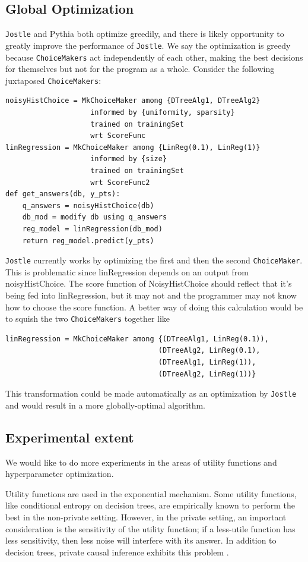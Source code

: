 \documentclass[11pt]{report}
\newcommand{\Jostle}{\texttt{Jostle}}
\renewcommand{\t}[1]{\texttt{#1}}
\begin{document}
\subsection{Global Optimization}
\Jostle{} and Pythia both optimize greedily, and there is likely opportunity to greatly improve the performance of \Jostle{}. We say the optimization is greedy because \t{ChoiceMakers} act independently of each other, making the best decisions for themselves but not for the program as a whole. Consider the following juxtaposed \t{ChoiceMakers}:
\begin{lstlisting}[style=MyPythonStyle]
noisyHistChoice = MkChoiceMaker among {DTreeAlg1, DTreeAlg2}
                    informed by {uniformity, sparsity}
                    trained on trainingSet 
                    wrt ScoreFunc
linRegression = MkChoiceMaker among {LinReg(0.1), LinReg(1)}
                    informed by {size}
                    trained on trainingSet
                    wrt ScoreFunc2
def get_answers(db, y_pts):
    q_answers = noisyHistChoice(db)
    db_mod = modify db using q_answers
    reg_model = linRegression(db_mod)
    return reg_model.predict(y_pts)
\end{lstlisting}
\Jostle{} currently works by optimizing the first and then the second \t{ChoiceMaker}. This is problematic since linRegression depends on an output from noisyHistChoice. The score function of NoisyHistChoice should reflect that it's being fed into linRegression, but it may not and the programmer may not know how to choose the score function. A better way of doing this calculation would be to squish the two \t{ChoiceMakers} together like
\begin{lstlisting}[style=MyPythonStyle]
linRegression = MkChoiceMaker among {(DTreeAlg1, LinReg(0.1)),
                                    (DTreeAlg2, LinReg(0.1),
                                    (DTreeAlg1, LinReg(1)),
                                    (DTreeAlg2, LinReg(1))}
\end{lstlisting}
This transformation could be made automatically as an optimization by \Jostle{} and would result in a more globally-optimal algorithm.
\subsection{Experimental extent}
We would like to do more experiments in the areas of utility functions and hyperparameter optimization. 

Utility functions are used in the exponential mechanism. Some utility functions, like conditional entropy on decision trees, are empirically known to perform the best in the non-private setting. However, in the private setting, an important consideration is the sensitivity of the utility function; if a less-utile function has less sensitivity, then less noise will interfere with its answer. In addition to decision trees, private causal inference exhibits this problem \cite{Kusner:2016}.


\end{document}
